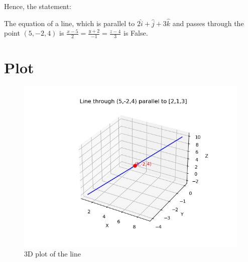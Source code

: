 \documentclass[12pt]{article}
\begin{document}
Hence, the statement:

The equation of a line, which is parallel to $2\hat{i} + \hat{j} + 3\hat{k}$ and passes through the point $(5, -2, 4)$ is $\frac{x - 5}{2} = \frac{y + 2}{-1} = \frac{z - 4}{3}$ is False.
\section*{Plot}
\begin{figure}[H]\centering
\includegraphics[width=1\columnwidth]{Figs/Figure_1.png}
\caption{3D plot of the line}
\label{fig:plt}
\end{figure}
\end{document}
